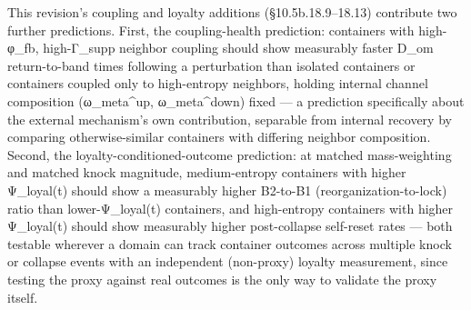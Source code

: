 \documentclass[
]{article}
\begin{document}
This revision's coupling and loyalty additions (§10.5b.18.9--18.13)
contribute two further predictions. First, the coupling-health
prediction: containers with high-φ\_fb, high-Γ\_supp neighbor coupling
should show measurably faster D\_om return-to-band times following a
perturbation than isolated containers or containers coupled only to
high-entropy neighbors, holding internal channel composition
(ω\_meta\^{}up, ω\_meta\^{}down) fixed --- a prediction specifically
about the external mechanism's own contribution, separable from internal
recovery by comparing otherwise-similar containers with differing
neighbor composition. Second, the loyalty-conditioned-outcome
prediction: at matched mass-weighting and matched knock magnitude,
medium-entropy containers with higher Ψ\_loyal(t) should show a
measurably higher B2-to-B1 (reorganization-to-lock) ratio than
lower-Ψ\_loyal(t) containers, and high-entropy containers with higher
Ψ\_loyal(t) should show measurably higher post-collapse self-reset rates
--- both testable wherever a domain can track container outcomes across
multiple knock or collapse events with an independent (non-proxy)
loyalty measurement, since testing the proxy against real outcomes is
the only way to validate the proxy itself.
\end{document}
